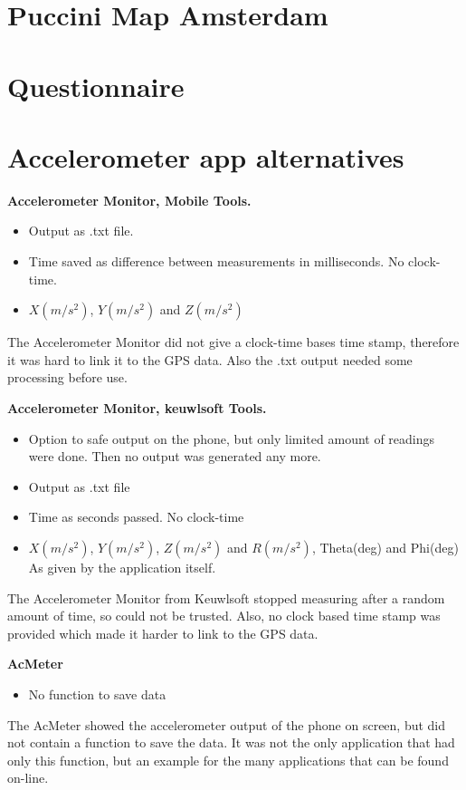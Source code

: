 \begin{appendix}
\section{Puccini Map Amsterdam}
\label{pucciniMap}

\clearpage

\section{Questionnaire}\label{Aquest}


\clearpage

\section{Accelerometer app alternatives}\label{Aapps}
\textbf{Accelerometer Monitor, Mobile Tools.}
\begin{itemize}
\item Output as .txt file. 
\item Time saved as difference between measurements in milliseconds. No clock-time.
\item $X(m/s^2)$, $Y(m/s^2)$ and $Z(m/s^2)$
\end{itemize}
The Accelerometer Monitor did not give a clock-time bases time stamp, therefore it was hard to link it to the GPS data. Also the .txt output needed some processing before use. 

\textbf{Accelerometer Monitor, keuwlsoft Tools.}
\begin{itemize}
\item Option to safe output on the phone, but only limited amount of readings were done. Then no output was generated any more.
\item Output as .txt file
\item Time as seconds passed. No clock-time
\item $X(m/s^2)$, $Y(m/s^2)$, $Z(m/s^2)$ and $R(m/s^2)$, Theta(deg) and Phi(deg) As given by the application itself. 
\end{itemize}
The Accelerometer Monitor from Keuwlsoft stopped measuring after a random amount of time, so could not be trusted. Also, no clock based time stamp was provided which made it harder to link to the GPS data.

\textbf{AcMeter}
\begin{itemize}
\item No function to save data
\end{itemize}
The AcMeter showed the accelerometer output of the phone on screen, but did not contain a function to save the data. It was not the only application that had only this function, but an example for the many applications that can be found on-line. 


\end{appendix}
